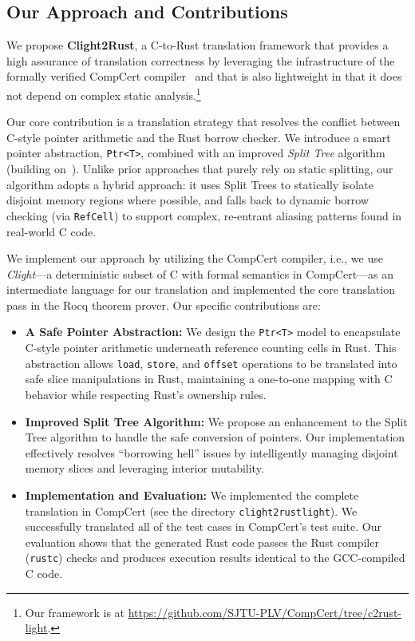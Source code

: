 \documentclass{llncs} %
\begin{document}
\subsection{Our Approach and Contributions}
%
We propose \textbf{Clight2Rust}, a C-to-Rust translation framework that provides
a high assurance of translation correctness by leveraging the infrastructure of the formally verified CompCert compiler~\cite{Leroy2009} and that is also lightweight in that it does not depend on complex static analysis.\footnote{Our framework is at {\small\url{https://github.com/SJTU-PLV/CompCert/tree/c2rust-light}}.}

Our core contribution is a translation strategy that resolves the conflict between C-style pointer arithmetic and the Rust borrow checker. We introduce a smart pointer abstraction, \texttt{Ptr<T>}, combined with an improved \emph{Split Tree} algorithm (building on~\cite{Fromherz2024}). Unlike prior approaches that purely rely on static splitting, our algorithm adopts a hybrid approach: it uses Split Trees to statically isolate disjoint memory regions where possible, and falls back to dynamic borrow checking (via \texttt{RefCell}) to support complex, re-entrant aliasing patterns found in real-world C code.

We implement our approach by utilizing the CompCert compiler, i.e., we use \emph{Clight}---a deterministic subset of C with formal semantics in CompCert---as an intermediate language for our translation and implemented the core translation pass in the Rocq theorem prover. Our specific contributions are:
\begin{itemize}
    \item \textbf{A Safe Pointer Abstraction:} We design the \texttt{Ptr<T>} model to encapsulate C-style pointer arithmetic underneath reference counting cells in Rust. This abstraction allows \texttt{load}, \texttt{store}, and \texttt{offset} operations to be translated into safe slice manipulations in Rust, maintaining a one-to-one mapping with C behavior while respecting Rust's ownership rules.
    \item \textbf{Improved Split Tree Algorithm:} We propose an enhancement to the Split Tree algorithm to handle the safe conversion of pointers. Our implementation effectively resolves ``borrowing hell'' issues by intelligently managing disjoint memory slices and leveraging interior mutability.
    \item \textbf{Implementation and Evaluation:} We implemented the complete translation in CompCert (see the directory \texttt{clight2rustlight}). We successfully translated all of the test cases in CompCert's test suite. Our evaluation shows that the generated Rust code passes the Rust compiler (\texttt{rustc}) checks and produces execution results identical to the GCC-compiled C code.
\end{itemize}
\end{document}
